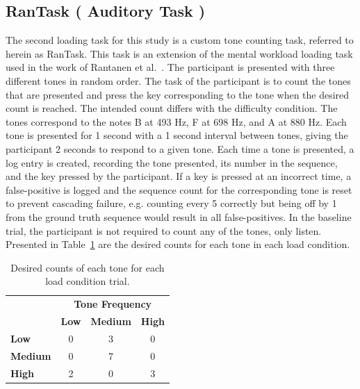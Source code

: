 \documentclass[11pt]{article}
\begin{document}
\subsection{RanTask ( Auditory Task )}
The second loading task for this study is a custom tone counting task, referred to herein as RanTask. This task is an extension of the mental workload loading task used in the work of Rantanen et al.~\cite{Rantanen}. The participant is presented with three different tones in random order. The task of the participant is to count the tones that are presented and press the key corresponding to the tone when the desired count is reached.  The intended count differs with the difficulty condition. The tones correspond to the notes B at 493 Hz, F at 698 Hz, and A at 880 Hz. Each tone is presented for 1 second with a 1 second interval between tones, giving the participant 2 seconds to respond to a given tone. Each time a tone is presented, a log entry is created, recording the tone presented, its number in the sequence, and the key pressed by the participant. If a key is pressed at an incorrect time, a false-positive is logged and the sequence count for the corresponding tone is reset to prevent cascading failure, e.g. counting every 5 correctly but being off by 1 from the ground truth sequence would result in all false-positives. In the baseline trial, the participant is not required to count any of the tones, only listen. Presented in Table~\ref{tab:ran} are the desired counts for each tone in each load condition.

\begin{table}[h]
\centering
\begin{tabular}{l|ccc}
                                                                     & \multicolumn{3}{c}{\textbf{Tone Frequency}}                                     \\
\rowcolor[HTML]{FFFFFF} 
\multicolumn{1}{c|}{\cellcolor[HTML]{FFFFFF}\textbf{Load Condition}} & \textbf{Low} & \textbf{Medium} & \textbf{High}                                   \\ \hline
\rowcolor[HTML]{FFFFFF} 
\textbf{Low}                                                         & 0          & 3               & \multicolumn{1}{c|}{\cellcolor[HTML]{FFFFFF}0}  \\
\rowcolor[HTML]{EFEFEF} 
\textbf{Medium}                                                      & 0       & 7              & \multicolumn{1}{c|}{\cellcolor[HTML]{EFEFEF}0} \\
\rowcolor[HTML]{FFFFFF} 
\textbf{High}                                                        & 2         & 0              & \multicolumn{1}{c|}{\cellcolor[HTML]{FFFFFF}3} \\ \cline{2-4} 
\end{tabular}
  \caption{Desired counts of each tone for each load condition trial.}
  \label{tab:ran}
\end{table}
\end{document}
